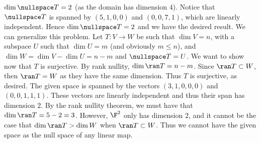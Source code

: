 \documentclass{book}
\begin{document}
\begin{enumerate}[label=\arabic*)]
       $\dim\nullspace T = 2$ (as the domain has dimension $4$). Notice that $\nullspace T$ is spanned by $(5, 1, 0, 0)$ and $(0, 0, 7, 1)$, which are linearly independent. Hence $\dim\nullspace T
       = 2$ and we have the desired result.
     \ii
       We can generalize this problem. Let $T: V \to W$ be such that $\dim V = n$, with a subspace $U$ such that $\dim U = m$ (and obviously $m \leq n$), and $\dim W = \dim V - \dim U = n -
       m$ and $\nullspace T = U$. We want to show now that $T$ is surjective. By rank nullity, $\dim\ran T = n - m$. Since $\ran T \subset W$, then $\ran T = W$ as they have the same dimension.
       Thus $T$ is surjective, as desired.
    \ii
      The given space is spanned by the vectors $(3, 1, 0, 0, 0)$ and $(0, 0, 1, 1, 1)$. These vectors are linearly independent and thus their span has dimension $2$. By the rank nullity
      theorem, we must have that $\dim\ran T = 5 - 2 = 3$. However, $\F^2$ only has dimension $2$, and it cannot be the case that $\dim\ran T > \dim W$ when $\ran T \subset W$. Thus we
      cannot have the given space as the null space of any linear map.


\end{enumerate}
\end{document}
